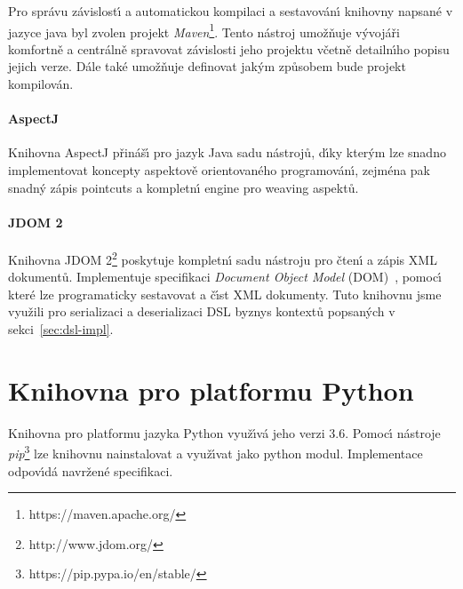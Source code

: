 Pro správu závislost\'{\i} a automatickou kompilaci a sestavován\'{\i}
knihovny napsané v jazyce java byl zvolen projekt
\textit{Maven}\footnote{https://maven.apache.org/}.
Tento nástroj umožňuje v\'yvojáři komfortně a centrálně
spravovat závislosti jeho projektu včetně detailn\'{\i}ho
popisu jejich verze. Dále také umožňuje definovat jak\'ym
způsobem bude projekt kompilován.

\paragraph{AspectJ}

Knihovna AspectJ přináš\'{\i} pro jazyk Java sadu nástrojů,
d\'{\i}ky kter\'ym lze snadno implementovat koncepty aspektově orientovaného
programován\'{\i}, zejména pak snadn\'y zápis pointcuts a kompletn\'{\i}
engine pro weaving aspektů.


\paragraph{JDOM 2}

Knihovna JDOM 2\footnote{http://www.jdom.org/} poskytuje
kompletn\'{\i} sadu nástroju pro čten\'{\i} a zápis \gls{XML} dokumentů.
Implementuje specifikaci \textit{Document Object Model} (\gls{DOM})~\cite{wood2004document},
pomoc\'{\i} které lze programaticky sestavovat a č\'{\i}st \gls{XML} dokumenty.
Tuto knihovnu jsme využili pro serializaci a deserializaci
\gls{DSL} byznys kontextů popsan\'ych v sekci~\ref{sec:dsl-impl}.

\section{Knihovna pro platformu Python}

Knihovna pro platformu jazyka Python využ\'{\i}vá jeho
verzi 3.6. Pomoc\'{\i} nástroje \textit{pip}\footnote{https://pip.pypa.io/en/stable/}
lze knihovnu nainstalovat a využ\'{\i}vat jako python modul.
Implementace odpov\'{\i}dá navržené specifikaci.


